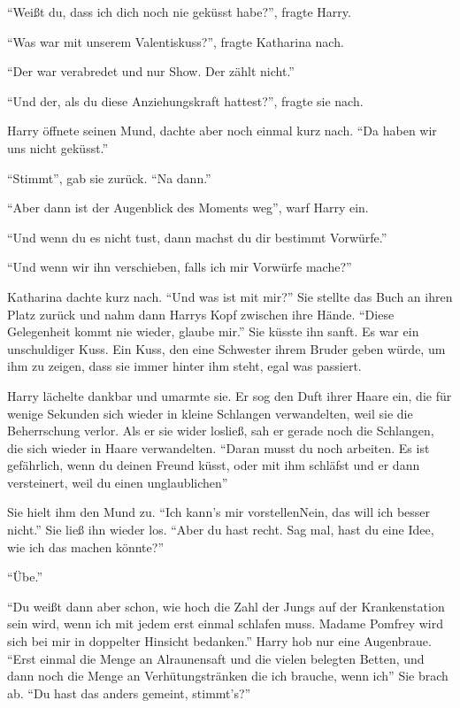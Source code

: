 \enquote{Weißt du, dass ich dich noch nie geküsst habe?}, fragte Harry.

\enquote{Was war mit unserem Valentiskuss?}, fragte Katharina nach.

\enquote{Der war verabredet und nur Show. Der zählt nicht.}

\enquote{Und der, als du diese Anziehungskraft hattest?}, fragte sie nach.

Harry öffnete seinen Mund, dachte aber noch einmal kurz nach. \enquote{Da haben wir uns nicht geküsst.}

\enquote{Stimmt}, gab sie zurück. \enquote{Na dann.}

\enquote{Aber dann ist der Augenblick des Moments weg}, warf Harry ein.

\enquote{Und wenn du es nicht tust, dann machst du dir bestimmt Vorwürfe.}

\enquote{Und wenn wir ihn verschieben, falls ich mir Vorwürfe mache?}

Katharina dachte kurz nach. \enquote{Und was ist mit mir?} Sie stellte das Buch an ihren Platz zurück und nahm dann Harrys Kopf zwischen ihre Hände. \enquote{Diese Gelegenheit kommt nie wieder, glaube mir.} Sie küsste ihn sanft. Es war ein unschuldiger Kuss. Ein Kuss, den eine Schwester ihrem Bruder geben würde, um ihm zu zeigen, dass sie immer hinter ihm steht, egal was passiert.

Harry lächelte dankbar und umarmte sie. Er sog den Duft ihrer Haare ein, die für wenige Sekunden sich wieder in kleine Schlangen verwandelten, weil sie die Beherrschung verlor. Als er sie wider losließ, sah er gerade noch die Schlangen, die sich wieder in Haare verwandelten. \enquote{Daran musst du noch arbeiten. Es ist gefährlich, wenn du deinen Freund küsst, oder mit ihm schläfst und er dann versteinert, weil du einen unglaublichen\abs}

Sie hielt ihm den Mund zu. \enquote{Ich kann’s mir vorstellen\abs Nein, das will ich besser nicht.} Sie ließ ihn wieder los. \enquote{Aber du hast recht. Sag mal, hast du eine Idee, wie ich das machen könnte?}

\enquote{Übe.}

\enquote{Du weißt dann aber schon, wie hoch die Zahl der Jungs auf der Krankenstation sein wird, wenn ich mit jedem erst einmal schlafen muss. Madame Pomfrey wird sich bei mir in doppelter Hinsicht bedanken.} Harry hob nur eine Augenbraue. \enquote{Erst einmal die Menge an Alraunensaft und die vielen belegten Betten, und dann noch die Menge an Verhütungstränken die ich brauche, wenn ich\abs} Sie brach ab. \enquote{Du hast das anders gemeint, stimmt’s?}

